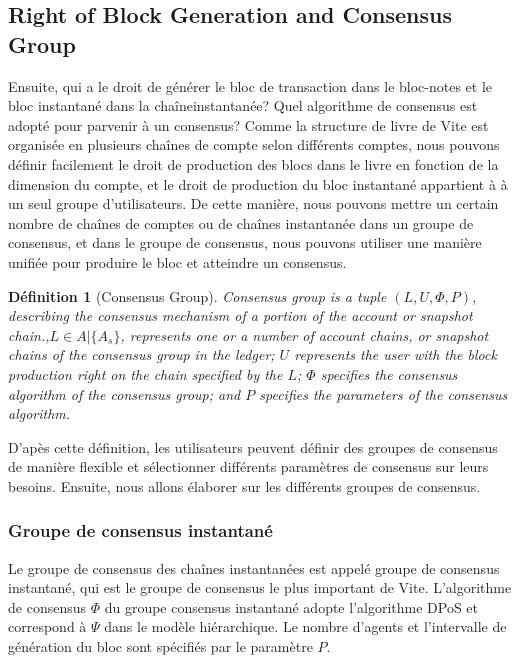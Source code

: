 \documentclass[UTF8,nofonts]{article}
\newtheorem{definition}{Définition}[section]
\begin{document}
\begin{multicols}{2}
\subsection{Right of Block Generation and Consensus Group}
Ensuite, qui a le droit de générer le bloc de transaction dans le bloc-notes et le bloc instantané dans la chaîneinstantanée? Quel algorithme de consensus est adopté pour parvenir à un consensus?
Comme la structure de livre de Vite est organisée en plusieurs chaînes de compte selon différents comptes, nous pouvons définir facilement le droit de production des blocs dans le livre en fonction de la dimension du compte, et le droit de production du bloc instantané appartient à à un seul groupe d'utilisateurs. De cette manière, nous pouvons mettre un certain nombre de chaînes de comptes ou de chaînes instantanée dans un groupe de consensus, et dans le groupe de consensus, nous pouvons utiliser une manière unifiée pour produire le bloc et atteindre un consensus.

\begin{definition}[Consensus Group]
Consensus group is a tuple $(L, U, \Phi, P)$, describing the consensus mechanism of a portion of the account or snapshot chain.,$L \in A \vert \{ A_s \}$,  represents one or a number of account chains, or snapshot chains of the consensus group in the ledger; $U$ represents the user with the block production right on the chain specified by the $L$; $\Phi$ specifies the consensus algorithm of the consensus group; and $P$ specifies the parameters of the consensus algorithm.

\end{definition}

D'apès cette définition, les utilisateurs peuvent définir des groupes de consensus de manière flexible et sélectionner différents paramètres de consensus sur leurs besoins. Ensuite, nous allons élaborer sur les différents groupes de consensus.

\subsubsection{Groupe de consensus instantané}
Le groupe de consensus des chaînes instantanées est appelé groupe de consensus instantané, qui est le groupe de consensus le plus important de Vite. L'algorithme de consensus $\Phi$ du groupe consensus instantané adopte l'algorithme DPoS et correspond à $\Psi$ dans le modèle hiérarchique. Le nombre d'agents et l'intervalle de génération du bloc sont spécifiés par le paramètre $P$.


\end{multicols}
\end{document}
